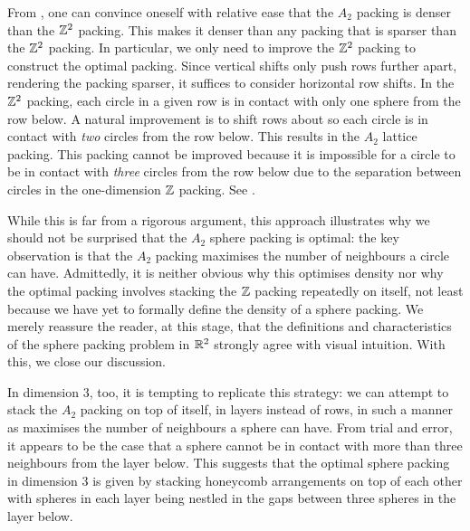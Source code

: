 From , one can convince oneself with relative ease that the $A_2$ packing is denser than the $\mathbb{Z}^2$ packing. This makes it denser than any packing that is sparser than the $\mathbb{Z}^2$ packing. In particular, we only need to improve the $\mathbb{Z}^2$ packing to construct the optimal packing. Since vertical shifts only push rows further apart, rendering the packing sparser, it suffices to consider horizontal row shifts. In the $\mathbb{Z}^2$ packing, each circle in a given row is in contact with only one sphere from the row below. A natural improvement is to shift rows about so each circle is in contact with \textit{two} circles from the row below. This results in the $A_2$ lattice packing. This packing cannot be improved because it is impossible for a circle to be in contact with \textit{three} circles from the row below due to the separation between circles in the one-dimension $\mathbb{Z}$ packing. See .

While this is far from a rigorous argument, this approach illustrates why we should not be surprised that the $A_2$ sphere packing is optimal: the key observation is that the $A_2$ packing maximises the number of neighbours a circle can have. Admittedly, it is neither obvious why this optimises density nor why the optimal packing involves stacking the $\mathbb{Z}$ packing repeatedly on itself, not least because we have yet to formally define the density of a sphere packing. We merely reassure the reader, at this stage, that the definitions and characteristics of the sphere packing problem in $\mathbb{R}^2$ strongly agree with visual intuition. With this, we close our discussion.

In dimension $3$, too, it is tempting to replicate this strategy: we can attempt to stack the $A_2$ packing on top of itself, in layers instead of rows, in such a manner as maximises the number of neighbours a sphere can have. From trial and error, it appears to be the case that a sphere cannot be in contact with more than three neighbours from the layer below. This suggests that the optimal sphere packing in dimension $3$ is given by stacking honeycomb arrangements on top of each other with spheres in each layer being nestled in the gaps between three spheres in the layer below.

